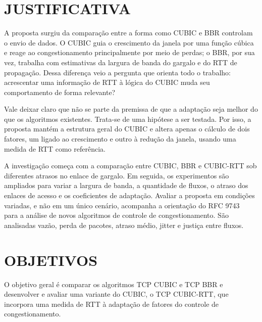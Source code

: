 \section{JUSTIFICATIVA}
A proposta surgiu da comparação entre a forma como CUBIC e BBR controlam o envio de dados. O CUBIC guia o crescimento da janela por uma função cúbica e reage ao congestionamento principalmente por meio de perdas; o BBR, por sua vez, trabalha com estimativas da largura de banda do gargalo e do RTT de propagação. Dessa diferença veio a pergunta que orienta todo o trabalho: acrescentar uma informação de RTT à lógica do CUBIC muda seu comportamento de forma relevante?

Vale deixar claro que não se parte da premissa de que a adaptação seja melhor do que os algoritmos existentes. Trata-se de uma hipótese a ser testada. Por isso, a proposta mantém a estrutura geral do CUBIC e altera apenas o cálculo de dois fatores, um ligado ao crescimento e outro à redução da janela, usando uma medida de RTT como referência.

A investigação começa com a comparação entre CUBIC, BBR e CUBIC-RTT sob diferentes atrasos no enlace de gargalo. Em seguida, os experimentos são ampliados para variar a largura de banda, a quantidade de fluxos, o atraso dos enlaces de acesso e os coeficientes de adaptação. Avaliar a proposta em condições variadas, e não em um único cenário, acompanha a orientação do RFC 9743~\cite{rfc9743} para a análise de novos algoritmos de controle de congestionamento. São analisadas vazão, perda de pacotes, atraso médio, jitter e justiça entre fluxos.

\section{OBJETIVOS}
O objetivo geral é comparar os algoritmos TCP CUBIC e TCP BBR e desenvolver e avaliar uma variante do CUBIC, o TCP CUBIC-RTT, que incorpora uma medida de RTT à adaptação de fatores do controle de congestionamento.

